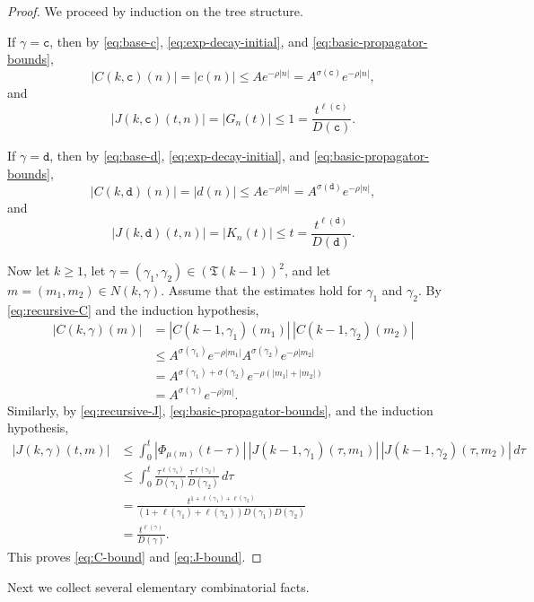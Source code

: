 \documentclass[12pt,reqno,tbtags]{amsart}
\newcommand\1{\mathbbm{1}}
\begin{document}
\begin{proof}
We proceed by induction on the tree structure.

If $\gamma=\mathtt{c}$, then by \eqref{eq:base-c}, \eqref{eq:exp-decay-initial}, and
\eqref{eq:basic-propagator-bounds},
\[
|C(k,\mathtt{c})(n)|=|c(n)|\leq A e^{-\rho |n|}
= A^{\sigma(\mathtt{c})}e^{-\rho |n|},
\]
and
\[
|J(k,\mathtt{c})(t,n)|=|G_n(t)|\leq 1
=\frac{t^{\ell(\mathtt{c})}}{D(\mathtt{c})}.
\]

If $\gamma=\mathtt{d}$, then by \eqref{eq:base-d}, \eqref{eq:exp-decay-initial}, and
\eqref{eq:basic-propagator-bounds},
\[
|C(k,\mathtt{d})(n)|=|d(n)|\leq A e^{-\rho |n|}
= A^{\sigma(\mathtt{d})}e^{-\rho |n|},
\]
and
\[
|J(k,\mathtt{d})(t,n)|=|K_n(t)|\leq t
=\frac{t^{\ell(\mathtt{d})}}{D(\mathtt{d})}.
\]

Now let $k\geq 1$, let $\gamma=(\gamma_1,\gamma_2)\in (\mathfrak{T}(k-1))^2$, and let
$m=(m_1,m_2)\in N(k,\gamma)$. Assume that the estimates hold for $\gamma_1$ and
$\gamma_2$. By \eqref{eq:recursive-C} and the induction hypothesis,
\begin{align*}
|C(k,\gamma)(m)|
&=
|C(k-1,\gamma_1)(m_1)|\,|C(k-1,\gamma_2)(m_2)| \\
&\leq
A^{\sigma(\gamma_1)}e^{-\rho |m_1|}
A^{\sigma(\gamma_2)}e^{-\rho |m_2|} \\
&=
A^{\sigma(\gamma_1)+\sigma(\gamma_2)}e^{-\rho (|m_1|+|m_2|)} \\
&=
A^{\sigma(\gamma)} e^{-\rho |m|}.
\end{align*}
Similarly, by \eqref{eq:recursive-J}, \eqref{eq:basic-propagator-bounds}, and the
induction hypothesis,
\begin{align*}
|J(k,\gamma)(t,m)|
&\leq
\int_0^t
|\Phi_{\mu(m)}(t-\tau)|\,
|J(k-1,\gamma_1)(\tau,m_1)|\,
|J(k-1,\gamma_2)(\tau,m_2)|\,d\tau \\
&\leq
\int_0^t
\frac{\tau^{\ell(\gamma_1)}}{D(\gamma_1)}
\frac{\tau^{\ell(\gamma_2)}}{D(\gamma_2)}\,d\tau \\
&=
\frac{t^{1+\ell(\gamma_1)+\ell(\gamma_2)}}{
(1+\ell(\gamma_1)+\ell(\gamma_2))D(\gamma_1)D(\gamma_2)} \\
&=
\frac{t^{\ell(\gamma)}}{D(\gamma)}.
\end{align*}
This proves \eqref{eq:C-bound} and \eqref{eq:J-bound}.
\end{proof}

Next we collect several elementary combinatorial facts.
\end{document}
